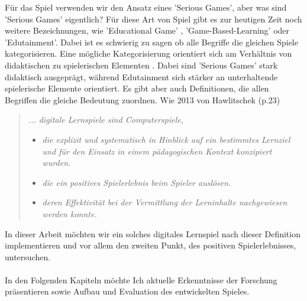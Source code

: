 Für das Spiel verwenden wir den Ansatz eines 'Serious Games', aber was sind 'Serious Games' eigentlich? Für diese Art von Spiel gibt es zur heutigen Zeit noch weitere Bezeichnungen, wie 'Educational Game' , 'Game-Based-Learning' oder 'Edutainment'. Dabei ist es schwierig zu sagen ob alle Begriffe die gleichen Spiele kategorisieren. Eine mögliche Kategorisierung orientiert sich am Verhältnis von didaktischen zu spielerischen Elementen \cite{Wechselberger2009}. Dabei sind 'Serious Games' stark didaktisch ausgeprägt, während Edutainment sich stärker an unterhaltende spielerische Elemente orientiert. Es gibt aber auch Definitionen, die allen Begriffen die gleiche Bedeutung zuordnen. Wie 2013 von Hawlitschek\cite{hawlitschek2013} (p.23)
\begin{quote}
\textit{... digitale Lernspiele sind Computerspiele,}
\begin{itemize}
\item \textit{die explizit und systematisch in Hinblick auf ein bestimmtes Lernziel und für den Einsatz in einem pädagogischen Kontext konzipiert wurden.}
\item \textit{die ein positives Spielerlebnis beim Spieler auslösen.}
\item \textit{deren Effektivität bei der Vermittlung der Lerninhalte nachgewiesen werden konnte.}
\end{itemize}
\end{quote}
In dieser Arbeit möchten wir ein solches digitales Lernspiel nach dieser Definition implementieren und vor allem den zweiten Punkt, des positiven Spielerlebnisses, untersuchen.\\
\\
In den Folgenden Kapiteln möchte Ich aktuelle Erkenntnisse der Forschung präsentieren sowie Aufbau und Evaluation des entwickelten Spieles.